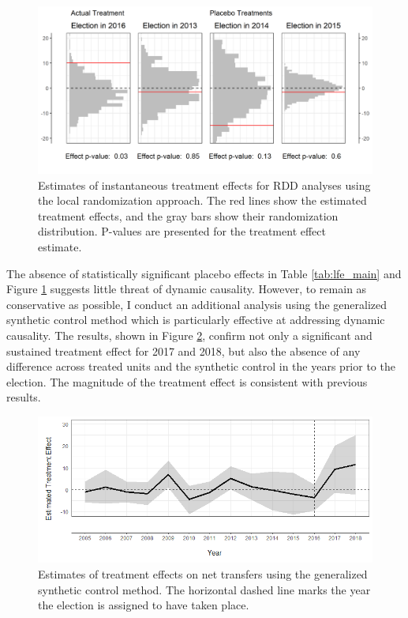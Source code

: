 \documentclass[12pt]{article}
\newcommand{\1}{\mathbbm{1}}
\begin{document}
\begin{figure}[!htbp]
	\centering
	\includegraphics[width=\textwidth]{figure/190618_rdd_results.png}
	\captionsetup{singlelinecheck=off}
	\caption[Estimated RDD treatment effects]{Estimates of instantaneous treatment effects for RDD analyses using the local randomization approach. The red lines show the estimated treatment effects, and the gray bars show their randomization distribution. P-values are presented for the treatment effect estimate.}
	\label{fig:rdd_placebo}
\end{figure}

The absence of statistically significant placebo effects in Table \ref{tab:lfe_main} and Figure \ref{fig:rdd_placebo} suggests little threat of dynamic causality. However, to remain as conservative as possible, I conduct an additional analysis using the generalized synthetic control method \citep{Xu2017gsynth} which is particularly effective at addressing dynamic causality. The results, shown in Figure \ref{fig:synth_placebo}, confirm not only a significant and sustained treatment effect for 2017 and 2018, but also the absence of any difference across treated units and the synthetic control in the years prior to the election. The magnitude of the treatment effect is consistent with previous results.

\begin{figure}[!htbp]
	\centering
	\includegraphics[width=\textwidth]{figure/190618_synth_results.png}
	\captionsetup{singlelinecheck=off}
	\caption[Estimated synthetic control treatment effects]{Estimates of treatment effects on net transfers using the generalized synthetic control method. The horizontal dashed line marks the year the election is assigned to have taken place.}
	\label{fig:synth_placebo}
\end{figure}
\end{document}
